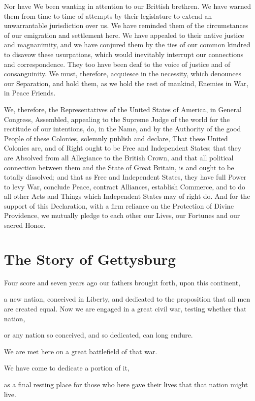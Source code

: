 \documentclass{article}
\begin{document}
Nor have We been wanting in attention to our Brittish brethren.
We have warned them from time to time of attempts by their
legislature to extend an unwarrantable jurisdiction over us.
We have reminded them of the circumstances of our emigration and
settlement here.  We have appealed to their native justice
and magnanimity, and we have conjured them by the ties of our
common kindred to disavow these usurpations, which would inevitably
interrupt our connections and correspondence.  They too have been
deaf to the voice of justice and of consanguinity.  We must, therefore,
acquiesce in the necessity, which denounces our Separation, and hold them,
as we hold the rest of mankind, Enemies in War, in Peace Friends.

We, therefore, the Representatives of the United States of America,
in General Congress, Assembled, appealing to the Supreme Judge of
the world for the rectitude of our intentions, do, in the Name,
and by the Authority of the good People of these Colonies,
solemnly publish and declare, That these United Colonies are,
and of Right ought to be Free and Independent States;
that they are Absolved from all Allegiance to the British Crown,
and that all political connection between them and the State
of Great Britain, is and ought to be totally dissolved;
and that as Free and Independent States, they have full Power to
levy War, conclude Peace, contract Alliances, establish Commerce,
and to do all other Acts and Things which Independent States may
of right do.  And for the support of this Declaration, with a firm
reliance on the Protection of Divine Providence, we mutually pledge
to each other our Lives, our Fortunes and our sacred Honor.

\section{The Story of Gettysburg}

Four score and seven years ago our fathers brought forth, upon this continent, 

a new nation, conceived in Liberty, and dedicated to the proposition that all men are created equal.
Now we are engaged in a great civil war, testing whether that nation, 

or any nation so conceived, and so dedicated, can long endure. 

We are met here on a great battlefield of that war. 

We have come to dedicate a portion of it, 

as a final resting place for those who here gave their lives that that nation might live. 
\end{document}
